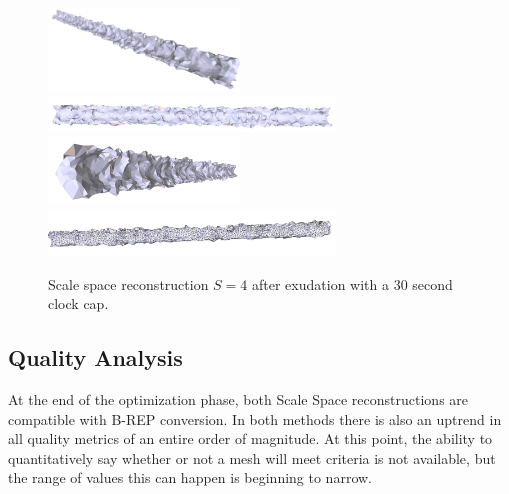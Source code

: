 \documentclass[12pt]{drexelthesis}
\let\Oldsubsection\subsection
\renewcommand{\subsection}{\FloatBarrier\Oldsubsection}
\begin{document}
\begin{figure}[!ht]
	\centering
		\includegraphics[width=2in]{simulated-lab-scan/2cmnoise/optimized/scalespace4everything00.png}
		\includegraphics[width=3in]{simulated-lab-scan/2cmnoise/optimized/scalespace4everything01.png}
		\includegraphics[width=2in]{simulated-lab-scan/2cmnoise/optimized/scalespace4everything02.png}
		\includegraphics[width=3in]{simulated-lab-scan/2cmnoise/optimized/scalespace4everything03.png}
		\caption[Scale space reconstruction $S = 4$ after exudation with a 30 second clock cap]{\centering Scale space reconstruction $S = 4$ after exudation with a 30 second clock cap.}
	\label{2cmnoise:scalespace4everything}
\end{figure}

\subsection{Quality Analysis}

At the end of the optimization phase, both Scale Space reconstructions are compatible with B-REP conversion. In both methods there is also an uptrend in all quality metrics of an entire order of magnitude. At this point, the ability to quantitatively say whether or not a mesh will meet criteria is not available, but the range of values this can happen is beginning to narrow.
\end{document}
